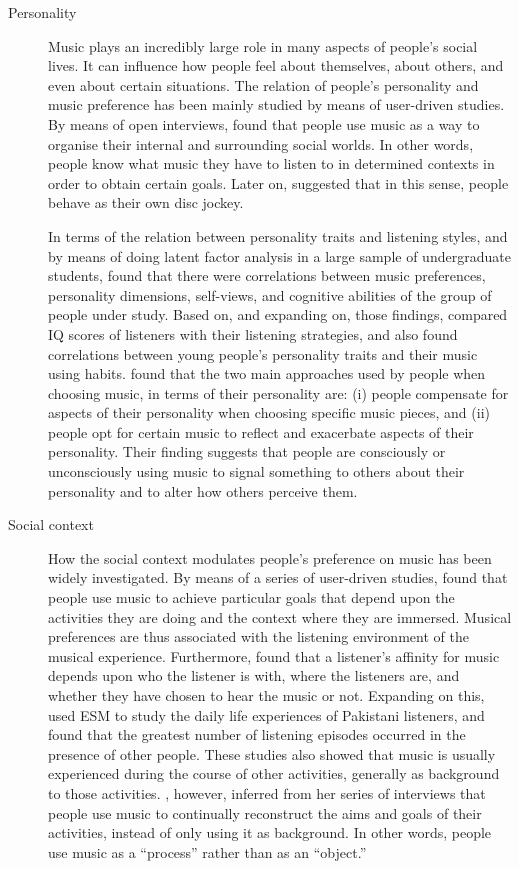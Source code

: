 \begin{description}

\item[Personality] Music plays an incredibly large role in many aspects of people's social lives. It can influence how people feel about themselves, about others, and even about certain situations. 
The relation of people's personality and music preference has been mainly studied by means of user-driven studies.
By means of open interviews, \textcite{denora00music} found that people use music as a way to organise their internal and surrounding social worlds. In other words, people know what music they have to listen to in determined contexts in order to obtain certain goals. 
Later on, \textcite{denora01aesthetic} suggested that in this sense, people behave as their own disc jockey. 

In terms of the relation between personality traits and listening styles, and by means of doing latent factor analysis in a large sample of undergraduate students, \textcite{rentfrow03doremi} found that there were correlations between music preferences, personality dimensions, self-views, and cognitive abilities of the group of people under study. 
Based on, and expanding on, those findings, \textcite{chamorro-premuzic07personality} compared IQ scores of listeners with their listening strategies, and also found correlations between young people's personality traits and their music using habits. \textcite{north08musical} found that the two main approaches used by people when choosing music, in terms of their personality are: (i) people compensate for aspects of their personality when choosing specific music pieces, and (ii)  people opt for certain music to reflect and exacerbate aspects of their personality. 
Their finding suggests that people are consciously or unconsciously using music to signal something to others about their personality and to alter how others perceive them.

\item[Social context] How the social context modulates people's preference on music has been widely investigated. By means of a series of user-driven studies, \textcite{kemp96musical, north96situational} found that people use music to achieve particular goals that depend upon the activities they are doing and the context where they are immersed. 
Musical preferences are thus associated with the listening environment of the musical experience. 
Furthermore, \textcite{north04uses} found that a listener's affinity for music depends upon who the listener is with, where the listeners are, and whether they have chosen to hear the music or not. 
Expanding on this, \textcite{rana07role} used ESM to study the daily life experiences of Pakistani listeners, and found that the greatest number of listening episodes occurred in the presence of other people.
These studies also showed that music is usually experienced during the course of other activities, generally as background to those activities. \textcite{denora00music}, however, inferred from her series of interviews that people use music to continually reconstruct the aims and goals of their activities, instead of only using it as background. In other words, people use music as a ``process'' rather than as an ``object.''


\end{description}

